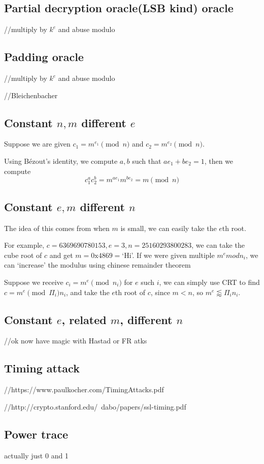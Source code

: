 \documentclass{report}
\begin{document}
\subsection{Partial decryption oracle(LSB kind) oracle}
//multiply by $k^e$ and abuse modulo
\subsection{Padding oracle}
//multiply by $k^e$ and abuse modulo

//Bleichenbacher
\subsection{Constant $n,m$ different $e$}
Suppose we are given $c_1=m^{e_1}\pmod n$ and $c_2=m^{e_2}\pmod n$. 

Using B\'ezout's identity, we compute $a,b$ such that $ae_1+be_2=1$, then we compute $$c_1^ac_2^b=m^{ae_1}m^{be_2}=m\pmod n$$

\subsection{Constant $e,m$ different $n$}

The idea of this comes from when $m$ is small, we can easily take the $e$th root.

For example, $c=6369690780153,e=3,n=25160293800283$, we can take the cube root of $c$ and get $m=0\text{x}4869=$`Hi'. If we were given multiple $m^e mod n_i$, we can `increase' the modulus using chinese remainder theorem

Suppose we receive $c_i=m^e\pmod n_i$ for $e$ such $i$, we can simply use CRT to find $c=m^e\pmod \Pi_i n_i$, and take the $e$th root of $c$, since $m<n$, so $m^e\lessapprox\Pi_in_i$.

\subsection{Constant $e$, related $m$, different $n$}
//ok now have magic with Hastad or FR atks
\subsection{Timing attack}
//https://www.paulkocher.com/TimingAttacks.pdf

//http://crypto.stanford.edu/~dabo/papers/ssl-timing.pdf
\subsection{Power trace}
actually just 0 and 1
\end{document}

